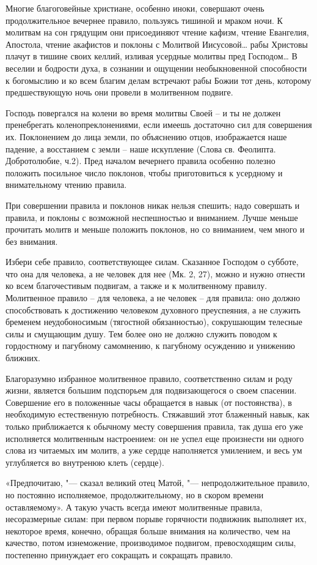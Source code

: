Многие благоговейные христиане, особенно иноки, совершают очень продолжительное вечернее правило, пользуясь тишиной и мраком ночи. К молитвам на сон грядущим они присоединяют чтение кафизм, чтение Евангелия, Апостола, чтение акафистов и поклоны с Молитвой Иисусовой… рабы Христовы плачут в тишине своих келлий, изливая усердные молитвы пред Господом… В веселии и бодрости духа, в сознании и ощущении необыкновенной способности к богомыслию и ко всем благим делам встречают рабы Божии тот день, которому предшествующую ночь они провели в молитвенном подвиге.

Господь повергался на колени во время молитвы Своей – и ты не должен пренебрегать коленопреклонениями, если имеешь достаточно сил для совершения их. Поклонением до лица земли, по объяснению отцов, изображается наше падение, а восстанием с земли – наше искупление (Слова св. Феолипта. Добротолюбие, ч.2). Пред началом вечернего правила особенно полезно положить посильное число поклонов, чтобы приготовиться к усердному и внимательному чтению правила.

При совершении правила и поклонов никак нельзя спешить; надо совершать и правила, и поклоны с возможной неспешностью и вниманием. Лучше меньше прочитать молитв и меньше положить поклонов, но со вниманием, чем много и без внимания.

Избери себе правило, соответствующее силам. Сказанное Господом о субботе, что она для человека, а не человек для нее (Мк. 2, 27), можно и нужно отнести ко всем благочестивым подвигам, а также и к молитвенному правилу. Молитвенное правило – для человека, а не человек – для правила: оно должно способствовать к достижению человеком духовного преуспеяния, а не служить бременем неудобоносимым (тягостной обязанностью), сокрушающим телесные силы и смущающим душу. Тем более оно не должно служить поводом к гордостному и пагубному самомнению, к пагубному осуждению и унижению ближних.

Благоразумно избранное молитвенное правило, соответственно силам и роду жизни, является большим подспорьем для подвизающегося о своем спасении. Совершение его в положенные часы обращается в навык (от постоянства), в необходимую естественную потребность. Стяжавший этот блаженный навык, как только приближается к обычному месту совершения правила, так душа его уже исполняется молитвенным настроением: он не успел еще произнести ни одного слова из читаемых им молитв, а уже сердце наполняется умилением, и весь ум углубляется во внутренюю клеть (сердце).

«Предпочитаю, "--- сказал великий отец Матой, "--- непродолжительное правило, но постоянно исполняемое, продолжительному, но в скором времени оставляемому». А такую участь всегда имеют молитвенные правила, несоразмерные силам: при первом порыве горячности подвижник выполняет их, некоторое время, конечно, обращая больше внимания на количество, чем на качество, потом изнеможение, производимое подвигом, превосходящим силы, постепенно принуждает его сокращать и сокращать правило.

